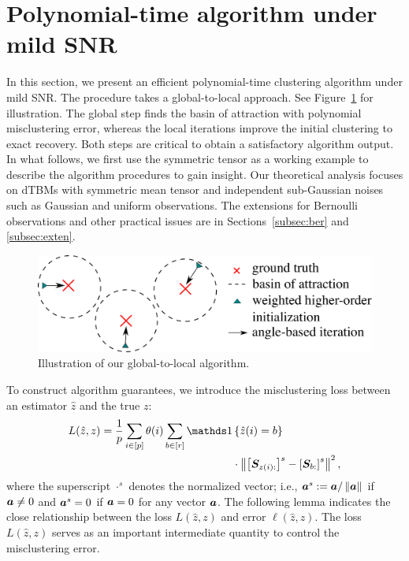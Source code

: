 \documentclass[journal]{IEEEtran}
\theoremstyle{definition}
\theoremstyle{definition}
\newcommand{\off}[1]{\left[#1\right]}
\newcommand{\offf}[1]{\left\{#1\right\}}
\begin{document}
\section{Polynomial-time algorithm under mild SNR}\label{sec:alg}
In this section, we present an efficient polynomial-time clustering algorithm under mild SNR. The procedure takes a global-to-local approach. See Figure~\ref{fig:demo} for illustration. The global step finds the basin of attraction with polynomial misclustering error, whereas the local iterations improve the initial clustering to exact recovery. Both steps are critical to obtain a satisfactory algorithm output. In what follows, we first use the symmetric tensor as a working example to describe the algorithm procedures to gain insight. {Our theoretical analysis focuses on dTBMs with symmetric mean tensor and independent sub-Gaussian noises} 
such as Gaussian and uniform observations.   {The extensions for Bernoulli observations and other practical issues are in Sections~\ref{subsec:ber} and \ref{subsec:exten}.}

\begin{figure}[ht!]
\centering
\includegraphics[width=.9\columnwidth]{alg_demo.pdf}
\caption{Illustration of our global-to-local algorithm.}\label{fig:demo}
\end{figure}

To construct algorithm guarantees,  we introduce the misclustering loss between an estimator $\hat z$ and the true $z$:
\begin{align}
     L(\hat z, z) = \frac{1}{p}  \sum_{i \in [p]} \theta(i) \sum_{b \in [r]}  \ind &\offf{ \hat z(i) = b } \\
     & \cdot \onorm{ \off{ \mS_{ z(i):}  }^s - \off{ \mS_{b:}  }^s  }^2, \label{eq:defnofL}
\end{align}
where the superscript $\cdot^{s}$ denotes the normalized vector; i.e., $\bm{a}^s:=\bm{a}/\left\lVert\bm{a}\right\rVert$ if $\bm{a}\neq 0$ and $\bm{a}^{s}=0$ if $\bm{a}=0$ for any vector $\bm{a}$. The following lemma indicates the close relationship between the loss $L(\hat z, z)$ and error $\ell(\hat z, z)$. The loss $L(\hat z, z)$ serves as an important intermediate quantity to control the misclustering error.
\end{document}
